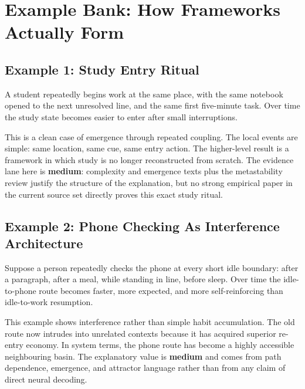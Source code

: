 \section{Example Bank: How Frameworks Actually Form}

\subsection{Example 1: Study Entry Ritual}

\begin{example}
A student repeatedly begins work at the same place, with the same notebook
opened to the next unresolved line, and the same first five-minute task. Over
time the study state becomes easier to enter after small interruptions.
\end{example}

\begin{discussion}
This is a clean case of emergence through repeated coupling. The local events
are simple: same location, same cue, same entry action. The higher-level
result is a framework in which study is no longer reconstructed from scratch.
The evidence lane here is \textbf{medium}: complexity and emergence texts plus
the metastability review justify the structure of the explanation, but no
strong empirical paper in the current source set directly proves this exact
study ritual.
\end{discussion}

\subsection{Example 2: Phone Checking As Interference Architecture}

\begin{example}
Suppose a person repeatedly checks the phone at every short idle boundary:
after a paragraph, after a meal, while standing in line, before sleep. Over
time the idle-to-phone route becomes faster, more expected, and more
self-reinforcing than idle-to-work resumption.
\end{example}

\begin{discussion}
This example shows interference rather than simple habit accumulation. The old
route now intrudes into unrelated contexts because it has acquired superior
re-entry economy. In system terms, the phone route has become a highly
accessible neighbouring basin. The explanatory value is \textbf{medium} and
comes from path dependence, emergence, and attractor language rather than from
any claim of direct neural decoding.
\end{discussion}

